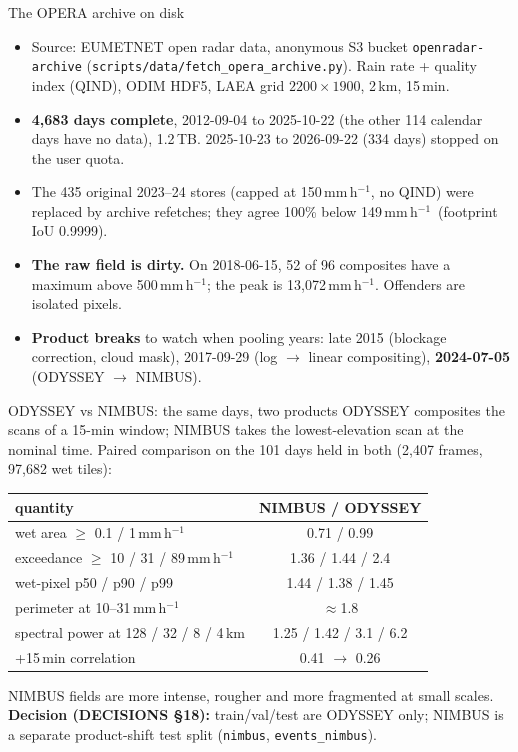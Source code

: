 \documentclass[aspectratio=169,10pt]{beamer}
\newcommand{\mmh}{\,mm\,h$^{-1}$}
\newcommand{\code}[1]{\texttt{\small #1}}
\begin{document}
\begin{frame}{The OPERA archive on disk}
  \small
  \begin{itemize}
    \item Source: EUMETNET open radar data, anonymous S3 bucket \code{openradar-archive}
      (\code{scripts/data/fetch\_opera\_archive.py}). Rain rate + quality index (QIND),
      ODIM HDF5, LAEA grid $2200\times1900$, 2\,km, 15\,min.
    \item \textbf{4,683 days complete}, 2012-09-04 to 2025-10-22 (the other 114 calendar days
      have no data), 1.2\,TB. 2025-10-23 to 2026-09-22 (334 days) stopped on the user quota.
    \item The 435 original 2023--24 stores (capped at 150\mmh, no QIND) were replaced by
      archive refetches; they agree 100\% below 149\mmh\ (footprint IoU 0.9999).
    \item \textbf{The raw field is dirty.} On 2018-06-15, 52 of 96 composites have a maximum
      above 500\mmh; the peak is 13,072\mmh. Offenders are isolated pixels.
    \item \textbf{Product breaks} to watch when pooling years: late 2015 (blockage correction,
      cloud mask), 2017-09-29 (log $\to$ linear compositing), \textbf{2024-07-05} (ODYSSEY
      $\to$ NIMBUS).
  \end{itemize}
\end{frame}

\begin{frame}{ODYSSEY vs NIMBUS: the same days, two products}
  \small
  ODYSSEY composites the scans of a 15-min window; NIMBUS takes the lowest-elevation scan at
  the nominal time. Paired comparison on the 101 days held in both (2,407 frames, 97,682 wet
  tiles):
  \vspace{2mm}

  \centering
  \begin{tabular}{lc}
    \toprule
    quantity & NIMBUS / ODYSSEY \\
    \midrule
    wet area $\ge$ 0.1 / 1\mmh & 0.71 / 0.99 \\
    exceedance $\ge$ 10 / 31 / 89\mmh & 1.36 / 1.44 / 2.4 \\
    wet-pixel p50 / p90 / p99 & 1.44 / 1.38 / 1.45 \\
    perimeter at 10--31\mmh & $\approx$1.8 \\
    spectral power at 128 / 32 / 8 / 4\,km & 1.25 / 1.42 / 3.1 / 6.2 \\
    +15\,min correlation & 0.41 $\to$ 0.26 \\
    \bottomrule
  \end{tabular}
  \vspace{2mm}

  \raggedright
  NIMBUS fields are more intense, rougher and more fragmented at small scales.
  \textbf{Decision (DECISIONS §18):} train/val/test are ODYSSEY only; NIMBUS is a separate
  product-shift test split (\code{nimbus}, \code{events\_nimbus}).
\end{frame}
\end{document}
